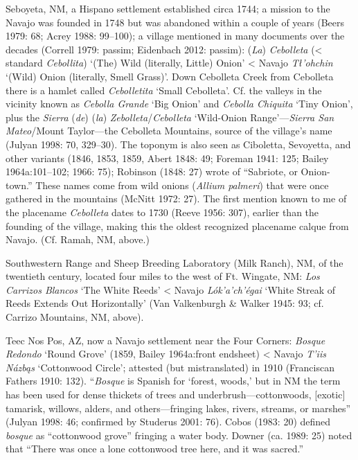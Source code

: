 Seboyeta, NM, a Hispano settlement established circa 1744; a mission to the Navajo was founded in 1748 but was abandoned within a couple of years (Beers 1979: 68; Acrey 1988: 99–100); a village mentioned in many documents over the decades (Correll 1979: passim; Eidenbach 2012: passim):  (\textit{La}) \textit{Cebolleta} ({\textless} standard \textit{Cebollita}) ‘(The) Wild (literally, Little) Onion’ {\textless} Navajo \textit{Tł'ohchin} ‘(Wild) Onion (literally, Smell Grass)’.  Down Cebolleta Creek from Cebolleta there is a hamlet called \textit{Cebolletita} ‘Small Cebolleta’.  Cf. the valleys in the vicinity known as \textit{Cebolla Grande} ‘Big Onion’ and \textit{Cebolla Chiquita} ‘Tiny Onion’, plus the \textit{Sierra }(\textit{de})\textit{ }(\textit{la}) \textit{Zebolleta}/\textit{Cebolleta} ‘Wild-Onion Range’—\textit{Sierra San Mateo}/Mount Taylor—the Cebolleta Mountains, source of the village’s name (Julyan 1998: 70, 329–30).  The toponym is also seen as Ciboletta, Sevoyetta, and other variants (1846, 1853, 1859, Abert 1848: 49; Foreman 1941: 125; Bailey 1964a:101–102; 1966: 75); Robinson (1848: 27) wrote of “Sabriote, or Onion-town.”  These names come from wild onions (\textit{Allium palmeri}) that were once gathered in the mountains (McNitt 1972: 27).  The first mention known to me of the placename \textit{Cebolleta }dates to 1730 (Reeve 1956: 307), earlier than the founding of the village, making this the oldest recognized placename calque from Navajo.  (Cf. Ramah, NM, above.)

Southwestern Range and Sheep Breeding Laboratory (Milk Ranch), NM, of the twentieth century, located four miles to the west of Ft. Wingate, NM:  \textit{Los Carrizos Blancos} ‘The White Reeds’ {\textless} Navajo \textit{Lók’a’ch’égai} ‘White Streak of Reeds Extends Out Horizontally’ (Van Valkenburgh \& Walker 1945: 93; cf. Carrizo Mountains, NM, above).

Teec Nos Pos, AZ, now a Navajo settlement near the Four Corners:  \textit{Bosque Redondo} ‘Round Grove’ (1859, Bailey 1964a:front endsheet) {\textless} Navajo \textit{T'iis Názbąs} ‘Cottonwood Circle’; attested (but mistranslated) in 1910 (Franciscan Fathers 1910: 132).  “\textit{Bosque }is Spanish for ‘forest, woods,’ but in NM the term has been used for dense thickets of trees and underbrush—cottonwoods, [exotic] tamarisk, willows, alders, and others—fringing lakes, rivers, streams, or marshes” (Julyan 1998: 46; confirmed by Studerus 2001: 76).  Cobos (1983: 20) defined \textit{bosque} as “cottonwood grove” fringing a water body.  Downer (ca. 1989: 25) noted that “There was once a lone cottonwood tree here, and it was sacred.”

